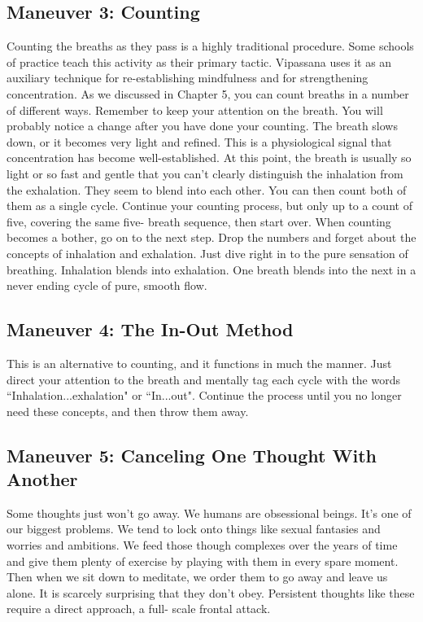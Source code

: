\subsection*{Maneuver 3: Counting}
Counting the breaths as they pass is a highly traditional procedure. Some
schools of practice teach this activity as their primary tactic.  Vipassana uses
it as an auxiliary technique for re-establishing mindfulness and for
strengthening concentration. As we discussed in Chapter 5, you can count breaths
in a number of different ways. Remember to keep your attention on the breath.
You will probably notice a change after you have done your counting. The breath
slows down, or it becomes very light and refined.  This is a physiological
signal that concentration has become well-established.  At this point, the
breath is usually so light or so fast and gentle that you can't clearly
distinguish the inhalation from the exhalation. They seem to blend into each
other. You can then count both of them as a single cycle. Continue your counting
process, but only up to a count of five, covering the same five- breath
sequence, then start over. When counting becomes a bother, go on to the next
step. Drop the numbers and forget about the concepts of inhalation and
exhalation. Just dive right in to the pure sensation of breathing. Inhalation
blends into exhalation. One breath blends into the next in a never ending cycle
of pure, smooth flow.

\subsection*{Maneuver 4: The In-Out Method} This is an alternative to counting, and it
functions in much the manner. Just direct your attention to the breath and
mentally tag each cycle with the words ``Inhalation...exhalation" or ``In...out".
Continue the process until you no longer need these concepts, and then throw
them away.

\subsection*{Maneuver 5: Canceling One Thought With Another}
Some thoughts just won't go away.  We humans are obsessional beings. It's one of
our biggest problems. We tend to lock onto things like sexual fantasies and
worries and ambitions. We feed those though complexes over the years of time and
give them plenty of exercise by playing with them in every spare moment. Then
when we sit down to meditate, we order them to go away and leave us alone. It is
scarcely surprising that they don't obey. Persistent thoughts like these require
a direct approach, a full- scale frontal attack.

